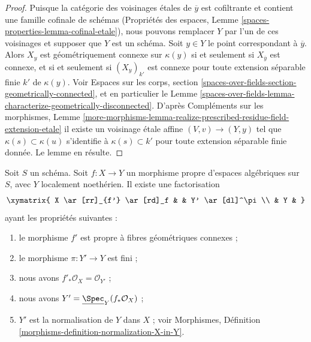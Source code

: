 \begin{proof}
Puisque la catégorie des voisinages étales de $\overline{y}$ est
cofiltrante et contient une famille cofinale de schémas
(Propriétés des espaces, Lemme \ref{spaces-properties-lemma-cofinal-etale}),
nous pouvons remplacer $Y$ par l'un de ces voisinages et supposer que
$Y$ est un schéma. Soit $y \in Y$ le point correspondant à $\overline{y}$.
Alors $X_y$ est géométriquement connexe sur $\kappa(y)$ si et seulement si
$X_{\overline{y}}$ est connexe, et si et seulement si $(X_y)_{k'}$
est connexe pour toute extension séparable finie $k'$ de $\kappa(y)$.
Voir Espaces sur les corps, section
\ref{spaces-over-fields-section-geometrically-connected}, et en particulier le
Lemme \ref{spaces-over-fields-lemma-characterize-geometrically-disconnected}.
D'après Compléments sur les morphismes, Lemme
\ref{more-morphisms-lemma-realize-prescribed-residue-field-extension-etale}
il existe un voisinage étale affine $(V, v) \to (Y, y)$ tel que
$\kappa(s) \subset \kappa(u)$ s'identifie à $\kappa(s) \subset k'$
pour toute extension séparable finie donnée. Le lemme en résulte.
\end{proof}

\begin{theorem}
\label{theorem-stein-factorization-Noetherian}
Soit $S$ un schéma. Soit $f : X \to Y$ un morphisme propre d'espaces
algébriques sur $S$, avec $Y$ localement noethérien.
Il existe une factorisation
$$
\xymatrix{
X \ar[rr]_{f'} \ar[rd]_f & & Y' \ar[dl]^\pi \\
& Y &
}
$$
ayant les propriétés suivantes :
\begin{enumerate}
\item le morphisme $f'$ est propre à fibres géométriques connexes ;
\item le morphisme $\pi : Y' \to Y$ est fini ;
\item nous avons $f'_*\mathcal{O}_X = \mathcal{O}_{Y'}$ ;
\item nous avons $Y' = \underline{\Spec}_Y(f_*\mathcal{O}_X)$ ;
\item $Y'$ est la normalisation de $Y$ dans $X$ ; voir
Morphismes, Définition \ref{morphisms-definition-normalization-X-in-Y}.
\end{enumerate}
\end{theorem}

